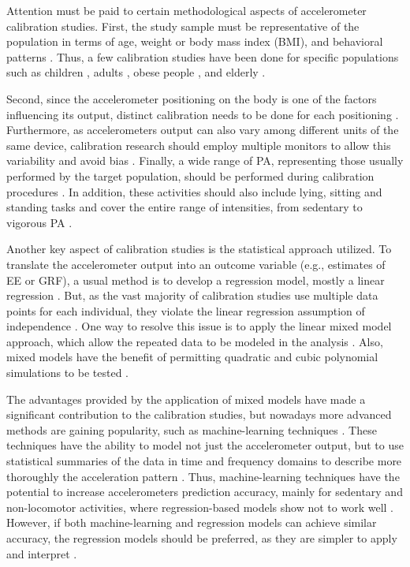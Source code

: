 \documentclass[12pt]{article}
\begin{document}
Attention must be paid to certain methodological aspects of accelerometer calibration studies. First, the study sample must be representative of the population in terms of age, weight or body mass index (BMI), and behavioral patterns . Thus, a few calibration studies have been done for specific populations such as children , adults , obese people , and elderly .

Second, since the accelerometer positioning on the body is one of the factors influencing its output, distinct calibration needs to be done for each positioning . Furthermore, as accelerometers output can also vary among different units of the same device, calibration research should employ multiple monitors to allow this variability and avoid bias . Finally, a wide range of PA, representing those usually performed by the target population, should be performed during calibration procedures . In addition, these activities should also include lying, sitting and standing tasks and cover the entire range of intensities, from sedentary to vigorous PA .

Another key aspect of calibration studies is the statistical approach utilized. To translate the accelerometer output into an outcome variable (e.g., estimates of EE or GRF), a usual method is to develop a regression model, mostly a linear regression . But, as the vast majority of calibration studies use multiple data points for each individual, they violate the linear regression assumption of independence . One way to resolve this issue is to apply the linear mixed model approach, which allow the repeated data to be modeled in the analysis . Also, mixed models have the benefit of permitting quadratic and cubic polynomial simulations to be tested .

The advantages provided by the application of mixed models have made a significant contribution to the calibration studies, but nowadays more advanced methods are gaining popularity, such as machine-learning techniques . These techniques have the ability to model not just the accelerometer output, but to use statistical summaries of the data in time and frequency domains to describe more thoroughly the acceleration pattern . Thus, machine-learning techniques have the potential to increase accelerometers prediction accuracy, mainly for sedentary and non-locomotor activities, where regression-based models show not to work well . However, if both machine-learning and regression models can achieve similar accuracy, the regression models should be preferred, as they are simpler to apply and interpret .
\end{document}
